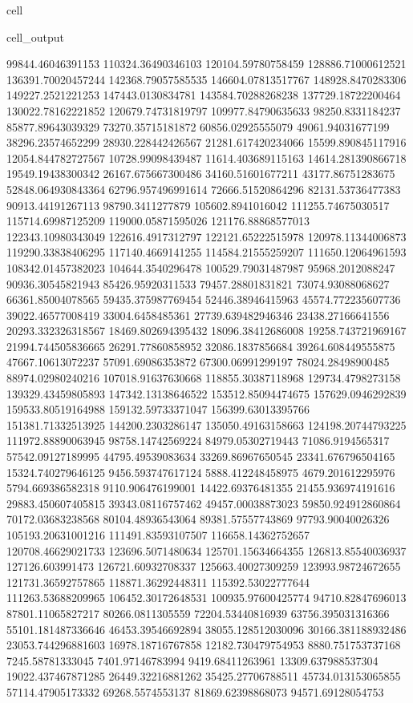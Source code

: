 \documentclass[letterpaper,10pt,english]{jupyterBook}
\begin{document}
\begin{sphinxuseclass}{cell}
\begin{sphinxVerbatimOutput}
\begin{sphinxuseclass}{cell_output}
\begin{sphinxVerbatim}[commandchars=\\\{\}]
99844.46046391153  110324.36490346103  120104.59780758459  128886.71000612521  136391.70020457244  142368.79057585535  146604.07813517767  148928.8470283306  149227.2521221253  147443.0130834781  143584.70288268238  137729.18722200464  130022.78162221852  120679.74731819797  109977.84790635633  98250.8331184237  85877.89643039329  73270.35715181872  60856.02925555079  49061.94031677199  38296.23574652299  28930.228442426567  21281.617420234066  15599.890845117916  12054.844782727567  10728.99098439487  11614.403689115163  14614.281390866718  19549.19438300342  26167.675667300486  34160.51601677211  43177.86751283675  52848.064930843364  62796.957496991614  72666.51520864296  82131.53736477383  90913.44191267113  98790.3411277879  105602.8941016042  111255.74675030517  115714.69987125209  119000.05871595026  121176.88868577013  122343.10980343049  122616.4917312797  122121.65222515978  120978.11344006873  119290.33838406295  117140.4669141255  114584.21555259207  111650.12064961593  108342.01457382023  104644.3540296478  100529.79031487987  95968.2012088247  90936.30545821943  85426.95920311533  79457.28801831821  73074.93088068627  66361.85004078565  59435.375987769454  52446.38946415963  45574.772235607736  39022.46577008419  33004.6458485361  27739.639482946346  23438.27166641556  20293.332326318567  18469.802694395432  18096.38412686008  19258.743721969167  21994.744505836665  26291.77860858952  32086.1837856684  39264.608449555875  47667.10613072237  57091.69086353872  67300.06991299197  78024.28498900485  88974.02980240216  
107018.91637630668  118855.30387118968  129734.4798273158  139329.43459805893  147342.13138646522  153512.85094474675  157629.0946292839  159533.80519164988  159132.59733371047  156399.63013395766  151381.71332513925  144200.2303286147  135050.49163158663  124198.20744793225  111972.88890063945  98758.14742569224  84979.05302719443  71086.9194565317  57542.09127189995  44795.49539083634  33269.86967650545  23341.676796504165  15324.740279646125  9456.593747617124  5888.412248458975  4679.201612295976  5794.669386582318  9110.906476199001  14422.69376481355  21455.936974191616  29883.450607405815  39343.08116757462  49457.00038873023  59850.924912860864  70172.03683238568  80104.48936543064  89381.57557743869  97793.90040026326  105193.20631001216  111491.83593107507  116658.14362752657  120708.46629021733  123696.5071480634  125701.15634664355  126813.85540036937  127126.603991473  126721.60932708337  125663.40027309259  123993.98724672655  121731.36592757865  118871.36292448311  115392.53022777644  111263.53688209965  106452.30172648531  100935.97600425774  94710.82847696013  87801.11065827217  80266.0811305559  72204.53440816939  63756.395031316366  55101.181487336646  46453.39546692894  38055.128512030096  30166.381188932486  23053.744296881603  16978.18716767858  12182.730479754953  8880.751753737168  7245.58781333045  7401.97146783994  9419.68411263961  13309.637988537304  19022.437467871285  26449.32216881262  35425.27706788511  45734.013153065855  57114.47905173332  69268.5574553137  81869.62398868073  94571.69128054753  

\end{sphinxVerbatim}
\end{sphinxuseclass}
\end{sphinxVerbatimOutput}
\end{sphinxuseclass}
\end{document}
